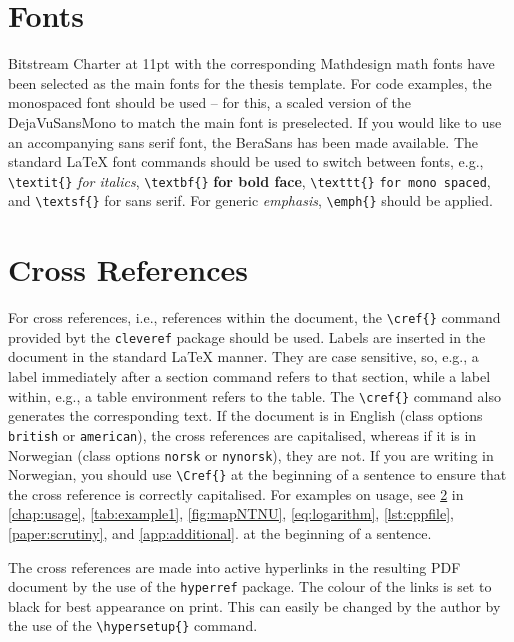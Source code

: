 {{\section{Fonts}

Bitstream Charter at 11pt with the corresponding Mathdesign math fonts have been selected as the main fonts for the thesis template. For code examples, the monospaced font should be used – for this, a scaled version of the DejaVuSansMono to match the main font is preselected. If you would like to use an accompanying sans serif font, the BeraSans has been made available. The standard \LaTeX{} font commands should be used to switch between fonts, e.g.,
\texttt{\textbackslash textit\{\}} \textit{for italics},
\texttt{\textbackslash textbf\{\}} \textbf{for bold face},
\texttt{\textbackslash texttt\{\}} \texttt{for mono spaced}, and
\texttt{\textbackslash textsf\{\}} \textsf{for sans serif}.
For generic \emph{emphasis}, \texttt{\textbackslash emph\{\}} should be applied.

\section{Cross References}
\label{sec:crossref}

For cross references, i.e., references within the document, the \texttt{\textbackslash cref\{\}} command provided byt the \texttt{cleveref} package should be used. Labels are inserted in the document in the standard \LaTeX{} manner. They are case sensitive, so, e.g., a label immediately after a section command refers to that section, while a label within, e.g., a table environment refers to the table. The \texttt{\textbackslash cref\{\}} command also generates the corresponding text. If the document is in English (class options \texttt{british} or \texttt{american}), the cross references are capitalised, whereas if it is in Norwegian (class options \texttt{norsk} or \texttt{nynorsk}), they are not. If you are writing in Norwegian, you should use \texttt{\textbackslash Cref\{\}} at the beginning of a sentence to ensure that the cross reference is correctly capitalised. For examples on usage, see \cref{sec:crossref} in \cref{chap:usage}, \cref{tab:example1}, \cref{fig:mapNTNU}, \cref{eq:logarithm}, \cref{lst:cppfile}, \cref{paper:scrutiny}, and \cref{app:additional}.  at the beginning of a sentence.

The cross references are made into active hyperlinks in the resulting PDF document by the use of the \texttt{hyperref} package. The colour of the links is set to black for best appearance on print. This can easily be changed by the author by the use of the \texttt{\textbackslash hypersetup\{\}} command.

}}
